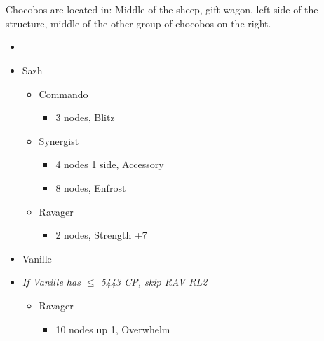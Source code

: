 \chapter[Chapter 8]{}

\begin{multicols}{2}
Chocobos are located in: Middle of the sheep, gift wagon, left side of the structure, middle of the other group of chocobos on the right. 
\begin{menu}
\begin{itemize}
    \paradigm
    \begin{itemize}
        \item {}%
{\paradigmline[1]{\textit{\com}}{\textit{\rav}}{}}%
{\paradigmline{(\com)}{(\med)}{}}%
{\paradigmline{\syn}{\sab}{}}%
{\paradigmline{\rav}{\rav}{}}%
{\paradigmline{\rav}{\sab}{}}%
{\paradigmline{\com}{\sab}{}}
    \end{itemize}
    \crystarium
    \begin{itemize}
        \item Sazh
        \begin{itemize}
            \item Commando
            \begin{itemize}
                \item 3 nodes, Blitz
            \end{itemize}
            \item Synergist
            \begin{itemize}
                \item 4 nodes 1 side, Accessory
                \item 8 nodes, Enfrost
            \end{itemize}
            \item Ravager
            \begin{itemize}
                \item 2 nodes, Strength +7
            \end{itemize}
        \end{itemize}
        \item Vanille 
        \item \textit{If Vanille has $\le$ 5443 CP, skip RAV RL2}
        \begin{itemize}
            \item Ravager
            \begin{itemize}
                \item 10 nodes up 1, Overwhelm

\end{itemize}
\end{itemize}
\end{itemize}
\end{itemize}
\end{menu}
\end{multicols}
